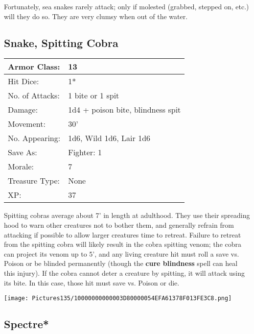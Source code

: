 \documentclass[a4paper,twoside,openany,10pt]{book}
\begin{document}
\begin{multicols}{2}
Fortunately, sea snakes rarely attack; only if molested (grabbed, stepped on, etc.) will they do so. They are very clumsy when out of the water.

\subsection*{Snake, Spitting Cobra}\label{snake-spitting-cobra}

\begin{tabularx}{0.50\textwidth}{@{}lX@{}}
Armor Class: & 13 \\\hline
Hit Dice: & 1* \\\hline
No. of Attacks: & 1 bite or 1 spit \\\hline
Damage: & 1d4 + poison bite, blindness spit \\\hline
Movement: & 30' \\\hline
No. Appearing: & 1d6, Wild 1d6, Lair 1d6 \\\hline
Save As: & Fighter: 1 \\\hline
Morale: & 7 \\\hline
Treasure Type: & None \\\hline
XP: & 37 \\\hline
\end{tabularx}\medskip

Spitting cobras average about 7' in length at adulthood. They use their spreading hood to warn other creatures not to bother them, and generally refrain from attacking if possible to allow larger creatures time to retreat. Failure to retreat from the spitting cobra will likely result in the cobra spitting venom; the cobra can project its venom up to 5', and any living creature hit must roll a save vs. Poison or be blinded permanently (though the \textbf{cure blindness} spell can heal this injury). If the cobra cannot deter a creature by spitting, it will attack using its bite. In this case, those hit must save vs. Poison or die.

\vfill

\begin{center} \texttt{[image: Pictures135/10000000000003D80000054EFA61378F013FE3C8.png]} \end{center}

\columnbreak


\subsection*{Spectre*}\label{spectre}


\end{multicols}
\end{document}

